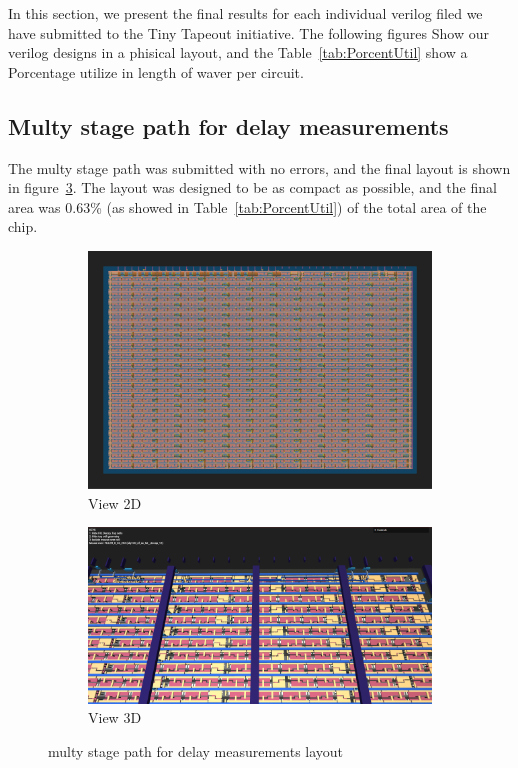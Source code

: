 In this section, we present the final results for each individual verilog 
filed we have submitted to the Tiny Tapeout initiative. The following figures 
Show our verilog designs in a phisical layout, and the Table\ \ref{tab:PorcentUtil} show 
a Porcentage utilize in length of waver per circuit.



\subsection{Multy stage path for delay measurements}

The multy stage path was submitted with no errors, and the final layout is shown in figure\ \ref{fig:delay_Layout}. The layout was designed to be as compact as possible, and the final area was 0.63\% (as showed in Table\ \ref*{tab:PorcentUtil}) of the total area of the chip. 

\begin{figure}[H]
    \centering
    \begin{subfigure}[b]{0.45\textwidth}
        \includegraphics[width=\linewidth]{Pictures/Result_Delay_2D_View.png}
        \caption{View 2D}\label{fig:delay_2D}
    \end{subfigure}
    \begin{subfigure}[b]{0.45\textwidth}
        \includegraphics[width=\linewidth]{Pictures/Result_Delay_3D_View.png}
        \caption{View 3D}\label{fig:delay_3D}
    \end{subfigure}
    \caption{multy stage path for delay measurements layout}\label{fig:delay_Layout}
\end{figure}

